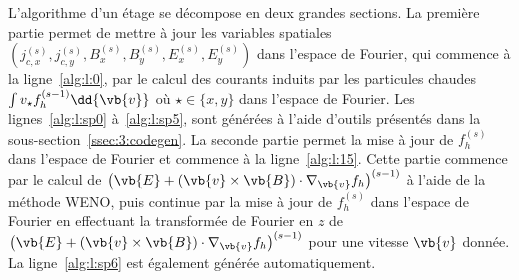 L'algorithme d'un étage se décompose en deux grandes sections. La première partie permet de mettre à jour les variables spatiales $(j_{c,x}^{(s)},j_{c,y}^{(s)},B_x^{(s)},B_y^{(s)},E_x^{(s)},E_y^{(s)})$ dans l'espace de Fourier, qui commence à la ligne~\ref{alg:l:0}, par le calcul des courants induits par les particules chaudes $\int v_\star f_h^{(s-1)}\dd{\vb{v}}$ où $\star\in\{x,y\}$ dans l'espace de Fourier. Les lignes~\ref{alg:l:sp0} à~\ref{alg:l:sp5}, sont générées à l'aide d'outils présentés dans la sous-section~\ref{ssec:3:codegen}. La seconde partie permet la mise à jour de $f_h^{(s)}$ dans l'espace de Fourier et commence à la ligne~\ref{alg:l:15}. Cette partie commence par le calcul de $\left(\vb{E}+(\vb{v}\times\vb{B})\cdot\nabla_{\vb{v}}f_h\right)^{(s-1)}$ à l'aide de la méthode WENO, puis continue par la mise à jour de $f_h^{(s)}$ dans l'espace de Fourier en effectuant la transformée de Fourier en $z$ de $\left(\vb{E}+(\vb{v}\times\vb{B})\cdot\nabla_{\vb{v}}f_h\right)^{(s-1)}$ pour une vitesse $\vb{v}$ donnée. La ligne~\ref{alg:l:sp6} est également générée automatiquement.

